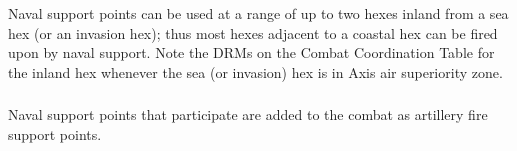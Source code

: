\subsubsection{}
Naval support points can be used at a range of up to two hexes inland from a sea hex (or an invasion hex); thus most hexes adjacent to a coastal hex can be fired upon by naval support. Note the DRMs on the Combat Coordination Table for the inland hex whenever the sea (or invasion) hex is in Axis air superiority zone.

\subsubsection{}
Naval support points that participate are added to the combat as artillery fire support points.